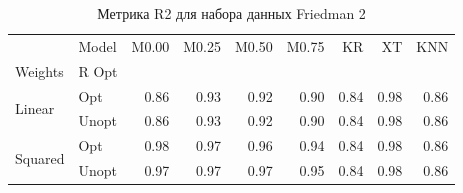 \begin{table}
\caption{Метрика R2 для набора данных Friedman 2}
\label{tab:R2_Friedman 2}
\begin{tabular}{llrrrrrrr}
\toprule
 & Model & M0.00 & M0.25 & M0.50 & M0.75 & KR & XT & KNN \\
Weights & R Opt &  &  &  &  &  &  &  \\
\midrule
\multirow[t]{2}{*}{Linear} & Opt & 0.86 & 0.93 & 0.92 & 0.90 & 0.84 & 0.98 & 0.86 \\
 & Unopt & 0.86 & 0.93 & 0.92 & 0.90 & 0.84 & 0.98 & 0.86 \\

\multirow[t]{2}{*}{Squared} & Opt & 0.98 & 0.97 & 0.96 & 0.94 & 0.84 & 0.98 & 0.86 \\
 & Unopt & 0.97 & 0.97 & 0.97 & 0.95 & 0.84 & 0.98 & 0.86 \\

\bottomrule
\end{tabular}
\end{table}
